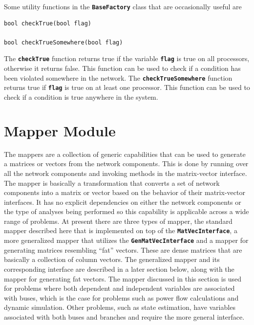 \documentclass[12pt]{report} %
\begin{document}
Some utility functions in the \texttt{\textbf{BaseFactory}} class that are occasionally useful are

{
\color{red}
\begin{Verbatim}[fontseries=b]
bool checkTrue(bool flag)

bool checkTrueSomewhere(bool flag)
\end{Verbatim}
}

The \texttt{\textbf{checkTrue}} function returns true if the variable \texttt{\textbf{flag}} is true on all processors, otherwise it returns false. This function can be used to check if a condition has been violated somewhere in the network. The \texttt{\textbf{checkTrueSomewhere}} function returns true if \texttt{\textbf{flag}} is true on at least one processor. This function can be used to check if a condition is true anywhere in the system.

\section{Mapper Module}

The mappers are a collection of generic capabilities that can be used to generate a matrices or vectors from the network components. This is done by running over all the network components and invoking methods in the matrix-vector interface. The mapper is basically a transformation that converts a set of network components into a matrix or vector based on the behavior of their matrix-vector interfaces. It has no explicit dependencies on either the network components or the type of analyses being performed so this capability is applicable across a wide range of problems. At present there are three types of mapper, the standard mapper described here that is implemented on top of the \texttt{\textbf{MatVecInterface}}, a more generalized mapper that utilizes the \texttt{\textbf{GenMatVecInterface}} and a mapper for generating matrices resembling ``fat'' vectors. These are dense matrices that are basically a collection of column vectors. The generalized mapper and its corresponding interface are described in a later section below, along with the mapper for generating fat vectors. The mapper discussed in this section is used for problems where both dependent and independent variables are associated with buses, which is the case for problems such as power flow calculations and dynamic simulation. Other problems, such as state estimation, have variables associated with both buses and branches and require the more general interface.
\end{document}

